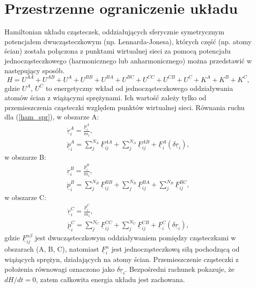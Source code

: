 \documentclass[12pt,a4paper,openright]{report} %
\begin{document}
\section{Przestrzenne ograniczenie układu}
\label{d_budowa_scian}
Hamiltonian układu cząsteczek, oddziałujących sferycznie symetrycznym potencjałem dwucząsteczkowym (np. Lennarda-Jonesa), których część (np. atomy ścian) została połączona z punktami wirtualnej sieci za pomocą potencjału jednocząsteczkowego (harmonicznego lub anharmonicznego) można przedstawić w następujący sposób.
\begin{equation}
H=U^{AA}+U^{AB}+U^{A}+U^{BB}+U^{BA}+U^{BC}+U^{CC}+U^{CB}+U^{C}+K^{A}+K^{B}+K^{C},
\label{ham_spr}
\end{equation}
gdzie $U^A$, $U^C$ to energetyczny wkład od jednocząsteczkowego oddziaływania atomów ścian z wiążącymi sprężynami. Ich wartość zależy tylko od przemieszczenia cząsteczki względem punktów wirtualnej sieci. Równania ruchu dla (\ref{ham_spr}),
\newline
w obszarze A:
%
\begin{equation}
\begin{gathered}
\underline{\dot{r}}_i^A=\frac{\underline{p}_i^A}{m_i},
%
\\
\underline{\dot{p}}_i^A=\sum_j^{N_A} \underline{F}_{ij}^{AA}
+\sum_j^{N_A} \underline{F}_{ij}^{AB}+\underline{F}_i^{A}(\delta
\underline{r}_i),
\end{gathered}
\end{equation}
%
w obszarze B:
\begin{equation}
\begin{gathered}
\underline{\dot{r}}_i^B=\frac{\underline{p}_i^B}{m_i},
\\
\underline{\dot{p}}_i^B=\sum_j^{N_B} \underline{F}_{ij}^{BB}
+\sum_j^{N_B} \underline{F}_{ij}^{BA}+\sum_j^{N_B}
\underline{F}_{ij}^{BC},
\end{gathered}
\end{equation}
%
w obszarze C:
\begin{equation}
\begin{gathered}
\underline{\dot{r}}_i^C=\frac{\underline{p}_i^C}{m_i},\\
\underline{\dot{p}}_i^C=\sum_j^{N_C} \underline{F}_{ij}^{CC}
+\sum_j^{N_C} \underline{F}_{ij}^{CB}+\underline{F}_i^{C}(\delta
\underline{r}_i),
\end{gathered}
\end{equation}
gdzie $\underline{F}_{ij}^{\alpha\beta}$ jest dwucząsteczkowym oddziaływaniem pomiędzy cząsteczkami w obszarach (A, B, C), natomiast
$\underline{F}_i^{\alpha}$ jest jednocząsteczkową siłą pochodzącą od wiążących sprężyn, działających na atomy ścian. Przemieszczenie cząsteczki z położenia równowagi oznaczono jako $\delta \underline{r}_i$. Bezpośredni rachunek pokazuje, że ${dH}/{dt}=0$, zatem całkowita energia układu jest zachowana.
%
\end{document}
